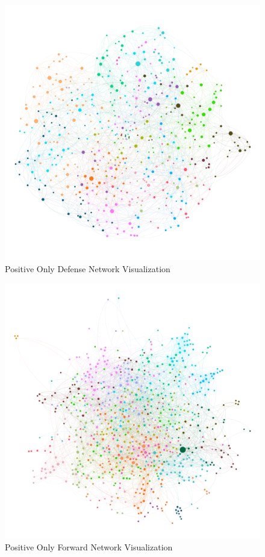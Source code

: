 \documentclass{article}
\begin{document}
\begin{figure}[H]
\centering
\includegraphics[scale=0.45]{images/defense-positive.png}
\caption{Positive Only Defense Network Visualization}
\label{vis3}
\end{figure}

\begin{figure}[H]
\centering
\includegraphics[scale=0.45]{images/forwards-positive.png}
\caption{Positive Only Forward Network Visualization}
\label{vis4}
\end{figure}
\end{document}
